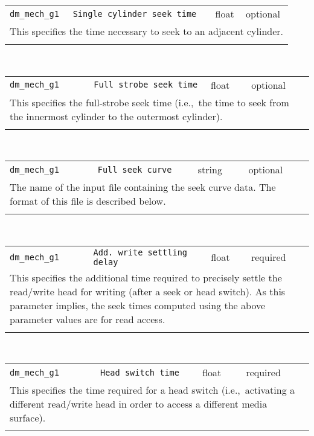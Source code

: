 \noindent 
\begin{tabular}{|p{1.5in}|p{3.5in}|p{0.5in}|p{0.5in}|}
\cline{1-4}
\texttt{dm\_mech\_g1} & \texttt{Single cylinder seek time} & float & optional \\ 
\cline{1-4}
\multicolumn{4}{|p{6in}|}{
This specifies the time necessary to seek to an adjacent cylinder.
}\\ 
\cline{1-4}
\multicolumn{4}{p{5in}}{}\\
\end{tabular}\\ 
\noindent 
\begin{tabular}{|p{1.5in}|p{3.5in}|p{0.5in}|p{0.5in}|}
\cline{1-4}
\texttt{dm\_mech\_g1} & \texttt{Full strobe seek time} & float & optional \\ 
\cline{1-4}
\multicolumn{4}{|p{6in}|}{
This specifies the full-strobe seek time (i.e.,~the time to seek from the
innermost cylinder to the outermost cylinder).
}\\ 
\cline{1-4}
\multicolumn{4}{p{5in}}{}\\
\end{tabular}\\ 
\noindent 
\begin{tabular}{|p{1.5in}|p{3.5in}|p{0.5in}|p{0.5in}|}
\cline{1-4}
\texttt{dm\_mech\_g1} & \texttt{Full seek curve} & string & optional \\ 
\cline{1-4}
\multicolumn{4}{|p{6in}|}{
The name of the input file containing the seek curve data.
The format of this file is described below.
}\\ 
\cline{1-4}
\multicolumn{4}{p{5in}}{}\\
\end{tabular}\\ 
\noindent 
\begin{tabular}{|p{1.5in}|p{3.5in}|p{0.5in}|p{0.5in}|}
\cline{1-4}
\texttt{dm\_mech\_g1} & \texttt{Add. write settling delay} & float & required \\ 
\cline{1-4}
\multicolumn{4}{|p{6in}|}{
This specifies the additional time required to precisely settle the
read/write head for writing (after a seek or head switch). As this
parameter implies, the seek times computed using the above parameter
values are for read access.
}\\ 
\cline{1-4}
\multicolumn{4}{p{5in}}{}\\
\end{tabular}\\ 
\noindent 
\begin{tabular}{|p{1.5in}|p{3.5in}|p{0.5in}|p{0.5in}|}
\cline{1-4}
\texttt{dm\_mech\_g1} & \texttt{Head switch time} & float & required \\ 
\cline{1-4}
\multicolumn{4}{|p{6in}|}{
This specifies the time required for a head switch (i.e.,~activating a
different read/write head in order to access a different media
surface).
}\\ 
\cline{1-4}
\multicolumn{4}{p{5in}}{}\\
\end{tabular}\\ 

